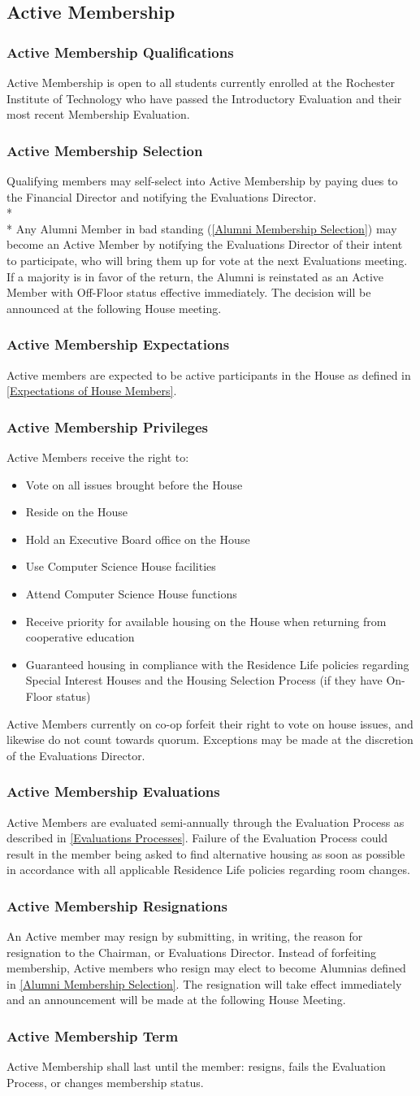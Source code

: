 \documentclass{article}
\newcommand{\asection}[1]{\subsection{#1} \label{#1}}
\newcommand{\asubsection}[1]{\subsubsection{#1} \label{#1}}
\begin{document}
\asection{Active Membership}
\asubsection{Active Membership Qualifications}
Active Membership is open to all students currently enrolled at the Rochester Institute of Technology who have passed the Introductory Evaluation and their most recent Membership Evaluation.
\asubsection{Active Membership Selection}
Qualifying members may self-select into Active Membership by paying dues to the Financial Director and notifying the Evaluations Director.
\\*\\*
Any Alumni Member in bad standing (\ref{Alumni Membership Selection}) may become an Active Member by notifying the Evaluations Director of their intent to participate, who will bring them up for vote at the next Evaluations meeting. If a majority is in favor of the return, the Alumni is reinstated as an Active Member with Off-Floor status effective immediately. The decision will be announced at the following House meeting.
\asubsection{Active Membership Expectations}
Active members are expected to be active participants in the House as defined in \ref{Expectations of House Members}.
\asubsection{Active Membership Privileges}
Active Members receive the right to:
\begin{itemize}
	\item Vote on all issues brought before the House
	\item Reside on the House
	\item Hold an Executive Board office on the House
	\item Use Computer Science House facilities
	\item Attend Computer Science House functions
	\item Receive priority for available housing on the House when returning from cooperative education
	\item Guaranteed housing in compliance with the Residence Life policies regarding Special Interest Houses and the Housing Selection Process (if they have On-Floor status)
\end{itemize}
Active Members currently on co-op forfeit their right to vote on house issues, and likewise do not count towards quorum. Exceptions may be made at the discretion of the Evaluations Director.
\asubsection{Active Membership Evaluations}
Active Members are evaluated semi-annually through the Evaluation Process as described in \ref{Evaluations Processes}.  Failure of the Evaluation Process could result in the member being asked to find alternative housing as soon as possible in accordance with all applicable Residence Life policies regarding room changes.
\asubsection{Active Membership Resignations}
An Active member may resign by submitting, in writing, the reason for resignation to the Chairman, or Evaluations Director. Instead of forfeiting membership, Active members who resign may elect to become Alumnias defined in \ref{Alumni Membership Selection}. The resignation will take effect immediately and an announcement will be made at the following House Meeting.
\asubsection{Active Membership Term}
Active Membership shall last until the member: resigns, fails the Evaluation Process, or changes membership status.
\end{document}

